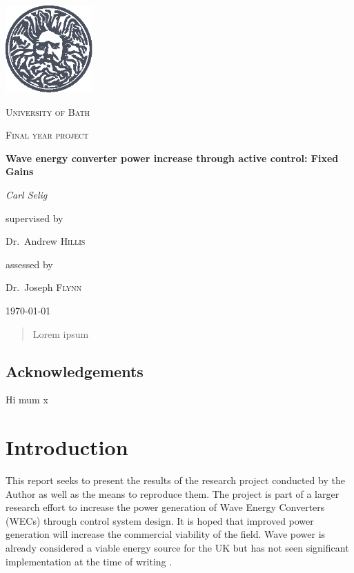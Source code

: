 \documentclass{report}
\begin{document}
\begin{titlepage}
	\centering
	\includegraphics[width=0.25\textwidth]{graphics/logo}\par\vspace{1cm}
	{\scshape\LARGE University of Bath \par}
	\vspace{1cm}
	{\scshape\Large Final year project\par}
	\vspace{1cm}
	{\huge\bfseries Wave energy converter power increase through active control: Fixed Gains\par}
	\vspace{2cm}
	{\Large\itshape Carl Selig\par}
	\vfill
	supervised by\par
	Dr.~Andrew \textsc{Hillis}\par
	assessed by\par
	Dr.~Joseph \textsc{Flynn}

	\vfill

	{\large \today\par}
\end{titlepage}

\begin{abstract}
Lorem ipsum
\end{abstract}
\section*{Acknowledgements}
Hi mum x
\tableofcontents
\listoffigures
\listoftables

\mbox{}


\printnomenclature

\chapter{Introduction}
This report seeks to present the results of the research project conducted by the Author as well as the means to reproduce them. The project is part of a larger research effort to increase the power generation of Wave Energy Converters (WECs) through control system design. It is hoped that improved power generation will increase the commercial viability of the field. Wave power is already considered a viable energy source for the UK \cite{carbonTrust} but has not seen significant implementation at the time of writing \cite{europeanMarineEnergyCenter}.
\end{document}
